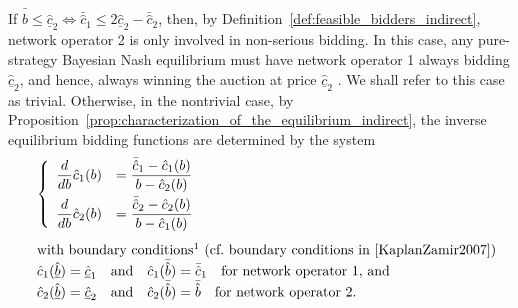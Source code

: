 If $\bar{\hat{b}} \leq \underline{\hat{c}}_2 \iff \bar{\hat{c}}_1 \le 2\underline{\hat{c}}_2 - \bar{\hat{c}}_2$, then, by Definition~\ref{def:feasible_bidders_indirect}, network operator 2 is only involved in non-serious bidding. In this case, any pure-strategy Bayesian Nash equilibrium must have network operator 1 always bidding $\underline{\hat{c}}_2$, and hence, always winning the auction at price $\underline{\hat{c}}_2$ \cite{KaplanZamir2007}. We shall refer to this case as trivial. Otherwise, in the nontrivial case, by Proposition~\ref{prop:characterization_of_the_equilibrium_indirect}, the inverse equilibrium bidding functions are determined by the system
\begin{equation}
  \label{eq:foc_restricted_indirect}
  \begin{array}{ll}
  &\left\{
  \begin{array}{ll}
    \displaystyle\frac{d}{db}\hat{c}_1(b) &= \displaystyle\frac{\bar{\hat{c}}_1 - \hat{c}_1(b)}{b - \hat{c}_2(b)} \\[2ex]
    \displaystyle\frac{d}{db}\hat{c}_2(b) &= \displaystyle\frac{\bar{\hat{c}}_2 - \hat{c}_2(b)}{b - \hat{c}_1(b)}
  \end{array}
  \right.\\[1cm]
  &\text{with boundary conditions\footnotemark~(cf.~boundary conditions in~\cite{KaplanZamir2007})}\\
  &\hat{c}_1(\underline{\hat{b}}) = \underline{\hat{c}}_1 \quad\text{and}\quad \hat{c}_1(\bar{\hat{b}}) = \bar{\hat{c}}_1 \quad\text{for network operator 1, and}\\
  &\hat{c}_2(\underline{\hat{b}}) = \underline{\hat{c}}_2 \quad\text{and}\quad \hat{c}_2(\bar{\hat{b}}) = \bar{\hat{b}} \quad\text{for network operator 2.}
  \end{array}
\end{equation}


